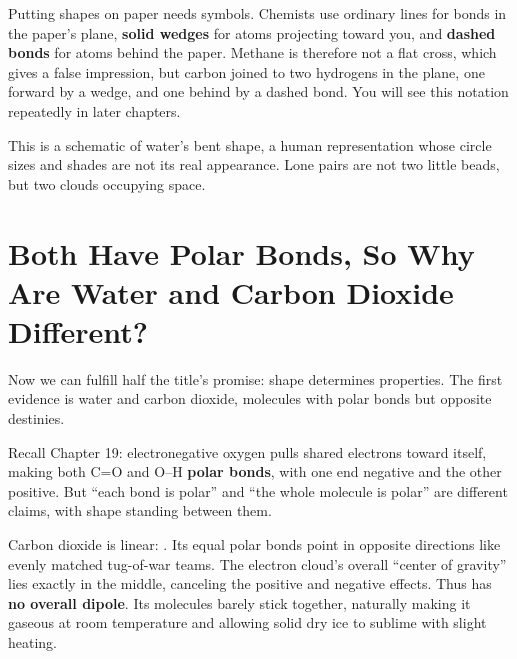 Putting shapes on paper needs symbols. Chemists use ordinary lines for bonds in the paper's plane, \textbf{solid wedges} for atoms projecting toward you, and \textbf{dashed bonds} for atoms behind the paper. Methane is therefore not a flat cross, which gives a false impression, but carbon joined to two hydrogens in the plane, one forward by a wedge, and one behind by a dashed bond. You will see this notation repeatedly in later chapters.


This is a schematic of water's bent shape, a human representation whose circle sizes and shades are not its real appearance. Lone pairs are not two little beads, but two clouds occupying space.

\section{Both Have Polar Bonds, So Why Are Water and Carbon Dioxide Different?}

Now we can fulfill half the title's promise: shape determines properties. The first evidence is water and carbon dioxide, molecules with polar bonds but opposite destinies.

Recall Chapter 19: electronegative oxygen pulls shared electrons toward itself, making both C=O and O--H \textbf{polar bonds}, with one end negative and the other positive. But ``each bond is polar'' and ``the whole molecule is polar'' are different claims, with shape standing between them.

Carbon dioxide is linear: . Its equal polar bonds point in opposite directions like evenly matched tug-of-war teams. The electron cloud's overall ``center of gravity'' lies exactly in the middle, canceling the positive and negative effects. Thus  has \textbf{no overall dipole}. Its molecules barely stick together, naturally making it gaseous at room temperature and allowing solid dry ice to sublime with slight heating.

